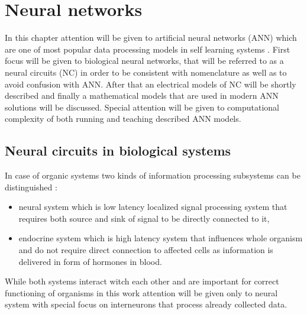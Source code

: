 \chapter{Neural networks}
\FloatBarrier

In this chapter attention will be given to artificial neural networks (ANN) which are one of most 
popular data processing models in self learning systems \cite{Abiodun2019} \cite{Tran2021}
\cite{Syed2021}. First focus will be given to biological neural networks, that will be referred 
to as a neural circuits (NC) in order to be consistent with nomenclature \cite{Purves2001} as 
well as to avoid confusion with ANN.  
After that an electrical models of NC will be shortly described and finally a mathematical models
that are used in modern ANN solutions will be discussed. Special attention will be given to 
computational complexity of both running and teaching described ANN models. 



\section{Neural circuits in biological systems}
\FloatBarrier
In case of organic systems two kinds of information processing subsystems can be distinguished
\cite{Johnson2016}:
\begin{itemize}
	\item neural system which is low latency localized signal processing system that requires
	both source and sink of signal to be directly connected to it, 
	\item endocrine system which is high latency system that influences whole organism and do 
	not require direct connection to affected cells as information is delivered in form of 
	hormones in blood.
\end{itemize}
While both systems interact witch each other and are important for correct functioning of 
organisms \cite{Schwarz2019} in this work attention will be given only to neural system with
special focus on interneurons that process already collected data.


